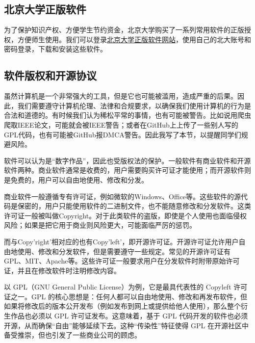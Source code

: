 \documentclass[../main.tex]{subfiles}
\begin{document}
\subsection{北京大学正版软件}

为了保护知识产权、方便学生节约资金，北京大学购买了一系列常用软件的正版授权，方便师生使用。我们可以登录\href{https://software.pku.edu.cn/}{北京大学正版软件网站}，使用自己的北大账号和密码登录，下载和安装这些软件。

\subsection{软件版权和开源协议}

虽然计算机是一个非常强大的工具，但是它也可能被滥用，造成严重的后果。因此，我们需要遵守计算机伦理、法律和合规要求，以确保我们使用计算机的行为是合法和道德的。有时候我们认为稀松平常的事情，也有可能被警告。比如说用爬虫爬取IEEE论文，可能就会被IEEE警告；或者在GitHub上上传了一些别人写的GPL代码，也有可能被GitHub报DMCA警告。因此我写了本节，以提醒同学们规避风险。

软件可以认为是“数字作品”，因此也受版权法的保护。一般软件有商业软件和开源软件两种。商业软件通常是收费的，用户需要购买许可证才能使用；而开源软件则是免费的，用户可以自由地使用、修改和分发。

商业软件一般遵循专有许可证，例如微软的Windows、Office等。这些软件的源代码是保密的，用户只能使用软件的二进制文件，也不能随意修改和分发软件。这类许可证一般被叫做Copyright。对于此类软件的盗版，即使是个人使用也面临侵权风险；如果是把它用于商业则风险更大，可能面临严厉的惩罚。

而与Copy'right'相对应的也有Copy'left'，即开源许可证。开源许可证允许用户自由地使用、修改和分发软件，但是需要遵守一些规定。常见的开源许可证有GPL、MIT、Apache等。这些许可证一般要求用户在分发软件时附带原始许可证，并且在修改软件时注明修改内容。

以 GPL（GNU General Public License）为例，它是最具代表性的 Copyleft 许可证之一。GPL 的核心思想是：任何人都可以自由地使用、修改和再发布软件，但如果将修改后的版本公开发布（例如发布到网上或提供给他人使用），那么整个衍生作品也必须以 GPL 许可证发布。这意味着，基于 GPL 代码开发的软件也必须开源，从而确保“自由”能够延续下去。这种“传染性”特征使得 GPL 在开源社区中备受推崇，但也引发了一些商业公司的顾虑。
\end{document}
